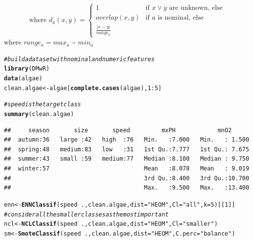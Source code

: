 \documentclass[10pt,a4paper]{article}\usepackage[]{graphicx}\usepackage[]{color}
\makeatletter
\newcommand{\hlnum}[1]{\textcolor[rgb]{0.686,0.059,0.569}{#1}}%
\newcommand{\hlstr}[1]{\textcolor[rgb]{0.192,0.494,0.8}{#1}}%
\newcommand{\hlcom}[1]{\textcolor[rgb]{0.678,0.584,0.686}{\textit{#1}}}%
\newcommand{\hlopt}[1]{\textcolor[rgb]{0,0,0}{#1}}%
\newcommand{\hlstd}[1]{\textcolor[rgb]{0.345,0.345,0.345}{#1}}%
\newcommand{\hlkwb}[1]{\textcolor[rgb]{0.69,0.353,0.396}{#1}}%
\newcommand{\hlkwc}[1]{\textcolor[rgb]{0.333,0.667,0.333}{#1}}%
\newcommand{\hlkwd}[1]{\textcolor[rgb]{0.737,0.353,0.396}{\textbf{#1}}}%
\newenvironment{kframe}{%
 \def\at@end@of@kframe{}%
 \ifinner\ifhmode%
  \def\at@end@of@kframe{\end{minipage}}%
  \begin{minipage}{\columnwidth}%
 \fi\fi%
 \def\FrameCommand##1{\hskip\@totalleftmargin \hskip-\fboxsep
 \colorbox{shadecolor}{##1}\hskip-\fboxsep
     \hskip-\linewidth \hskip-\@totalleftmargin \hskip\columnwidth}%
 \MakeFramed {\advance\hsize-\width
   \@totalleftmargin\z@ \linewidth\hsize
   \@setminipage}}%
 {\par\unskip\endMakeFramed%
 \at@end@of@kframe}
\newenvironment{knitrout}{}{} %
\makeatother
\begin{document}
\begin{equation}\label{eq:auxHEOM}
\mbox{where  } d_a(x,y)= \begin{cases} 1 & \mbox{if } x \vee y \mbox{ are unknown, else} \\
overlap(x,y) & \mbox{if } a \mbox{ is nominal, else} \\
\frac{|x-y|}{range_a}
\end{cases}
\end{equation}
\noindent where $range_a=max_a-min_a$


\begin{knitrout}\footnotesize
{}\color{fgcolor}\begin{kframe}
\begin{alltt}
\hlcom{# build a data set with nominal and numeric features}
\hlkwd{library}\hlstd{(DMwR)}
\hlkwd{data}\hlstd{(algae)}
\hlstd{clean.algae} \hlkwb{<-} \hlstd{algae[}\hlkwd{complete.cases}\hlstd{(algae),}\hlnum{1}\hlopt{:}\hlnum{5}\hlstd{]}

\hlcom{# speed is the target class}
\hlkwd{summary}\hlstd{(clean.algae)}
\end{alltt}
\begin{verbatim}
##     season       size       speed         mxPH            mnO2       
##  autumn:36   large :42   high  :76   Min.   :7.000   Min.   : 1.500  
##  spring:48   medium:83   low   :31   1st Qu.:7.777   1st Qu.: 7.675  
##  summer:43   small :59   medium:77   Median :8.100   Median : 9.750  
##  winter:57                           Mean   :8.078   Mean   : 9.019  
##                                      3rd Qu.:8.400   3rd Qu.:10.700  
##                                      Max.   :9.500   Max.   :13.400
\end{verbatim}
\begin{alltt}
\hlstd{enn} \hlkwb{<-} \hlkwd{ENNClassif}\hlstd{(speed}\hlopt{~}\hlstd{., clean.algae,} \hlkwc{dist}\hlstd{=}\hlstr{"HEOM"}\hlstd{,}  \hlkwc{Cl}\hlstd{=}\hlstr{"all"}\hlstd{,} \hlkwc{k}\hlstd{=}\hlnum{5}\hlstd{)[[}\hlnum{1}\hlstd{]]}
\hlcom{#consider all the smaller classes as the most important}
\hlstd{ncl} \hlkwb{<-} \hlkwd{NCLClassif}\hlstd{(speed}\hlopt{~}\hlstd{., clean.algae,} \hlkwc{dist}\hlstd{=}\hlstr{"HEOM"}\hlstd{,}  \hlkwc{Cl}\hlstd{=}\hlstr{"smaller"}\hlstd{)}
\hlstd{sm} \hlkwb{<-} \hlkwd{SmoteClassif}\hlstd{(speed}\hlopt{~}\hlstd{., clean.algae,} \hlkwc{dist}\hlstd{=}\hlstr{"HEOM"}\hlstd{,} \hlkwc{C.perc}\hlstd{=}\hlstr{"balance"}\hlstd{)}
\end{alltt}
\end{kframe}
\end{knitrout}
\end{document}
